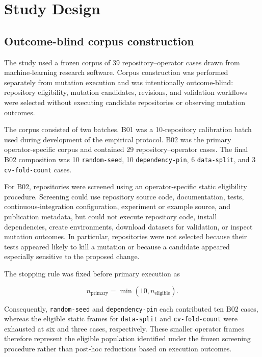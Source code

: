 \section{Study Design}
\label{sec:study-design}

\subsection{Outcome-blind corpus construction}
\label{sec:corpus-construction}

The study used a frozen corpus of 39 repository--operator cases
drawn from machine-learning research software. Corpus construction was
performed separately from mutation execution and was intentionally
outcome-blind: repository eligibility, mutation candidates, revisions, and
validation workflows were selected without executing candidate repositories
or observing mutation outcomes.

The corpus consisted of two batches. B01 was a 10-repository calibration batch
used during development of the empirical protocol. B02 was the primary
operator-specific corpus and contained 29 repository--operator cases. The
final B02 composition was 10 \texttt{random-seed}, 10
\texttt{dependency-pin}, 6 \texttt{data-split}, and 3
\texttt{cv-fold-count} cases.

For B02, repositories were screened using an operator-specific static
eligibility procedure. Screening could use repository source code,
documentation, tests, continuous-integration configuration, experiment or
example source, and publication metadata, but could not execute repository
code, install dependencies, create environments, download datasets for
validation, or inspect mutation outcomes. In particular, repositories were
not selected because their tests appeared likely to kill a mutation or
because a candidate appeared especially sensitive to the proposed change.

The stopping rule was fixed before primary execution as

\[
n_{\mathrm{primary}} = \min(10, n_{\mathrm{eligible}}).
\]

Consequently, \texttt{random-seed} and \texttt{dependency-pin} each
contributed ten B02 cases, whereas the eligible static frames for
\texttt{data-split} and \texttt{cv-fold-count} were exhausted at six and
three cases, respectively. These smaller operator frames therefore represent
the eligible population identified under the frozen screening procedure
rather than post-hoc reductions based on execution outcomes.

